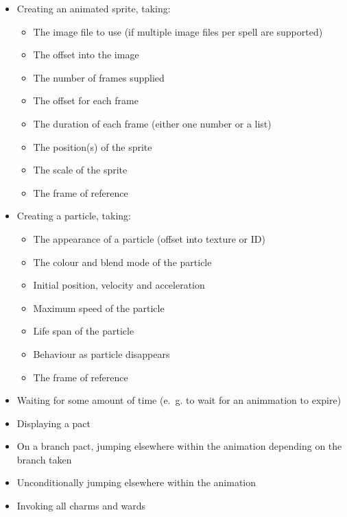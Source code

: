 \documentclass{article}
\begin{document}
\begin{itemize}
  \item Creating an animated sprite, taking:
  \begin{itemize}
    \item The image file to use (if multiple image files per spell are supported)
    \item The offset into the image
    \item The number of frames supplied
    \item The offset for each frame
    \item The duration of each frame (either one number or a list)
    \item The position(s) of the sprite
    \item The scale of the sprite
    \item The frame of reference
  \end{itemize}
  \item Creating a particle, taking:
  \begin{itemize}
    \item The appearance of a particle (offset into texture or ID)
    \item The colour and blend mode of the particle
    \item Initial position, velocity and acceleration
    \item Maximum speed of the particle
    \item Life span of the particle
    \item Behaviour as particle disappears
    \item The frame of reference
  \end{itemize}
  \item Waiting for some amount of time (e.~g. to wait for an animmation to expire)
  \item Displaying a pact
  \item On a branch pact, jumping elsewhere within the animation depending on the branch taken
  \item Unconditionally jumping elsewhere within the animation
  \item Invoking all charms and wards
\end{itemize}
\end{document}
